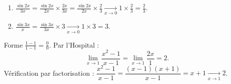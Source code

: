 \documentclass[11pt,a4paper]{article}
\begin{document}
\begin{correction}
\begin{enumerate}[label=\alph*),leftmargin=2em,itemsep=3pt]
  \item $\displaystyle\frac{\sin 2x}{3x}=\frac{\sin 2x}{2x}\times\frac{2x}{3x}=\frac{\sin 2x}{2x}\times\frac23\xrightarrow[x\to0]{}1\times\frac23=\frac23$.
  \item $\displaystyle\frac{\sin 3x}{x}=\frac{\sin 3x}{3x}\times 3\xrightarrow[x\to0]{}1\times 3=3$.
\end{enumerate}
\end{correction}

\begin{correction}
Forme $\frac{1-1}{1-1}=\frac00$. Par l'Hospital :
\[ \lim_{x\to 1}\frac{x^2-1}{x-1}=\lim_{x\to 1}\frac{2x}{1}=2. \]
Vérification par factorisation : $\dfrac{x^2-1}{x-1}=\dfrac{(x-1)(x+1)}{x-1}=x+1\xrightarrow[x\to1]{}2$. \checkmark
\end{correction}
\end{document}
